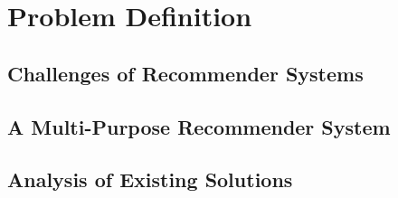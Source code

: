 \chapter{Problem Definition}

\section{Challenges of Recommender Systems}
\section{A Multi-Purpose Recommender System}
\section{Analysis of Existing Solutions}